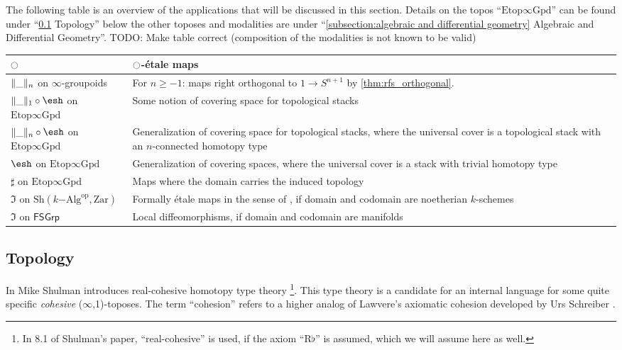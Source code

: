 \documentclass[9pt,twosided]{amsart}
\newcommand{\shape}{\ensuremath{\mathord{\raisebox{0.5pt}{\text{\rm\esh}}}}}
\newcommand{\Zar}{\ensuremath{\mathrm{Zar}}}
\newcommand{\FSGrp}{\ensuremath{\mathsf{FSGrp}}}
\newcommand{\Spaces}{\ensuremath{\mathrm{Etop}\infty\mathrm{Gpd}}}
\newcommand{\todo}[1]{{\color{red}TODO: #1 \\}}
\begin{document}
The following table is an overview of the applications that will be discussed in this section.
Details on the topos ``$\Spaces$'' can be found under ``\ref{subsection:toplogical stacks} Topology'' below the other toposes and modalities are under ``\ref{subsection:algebraic and differential geometry} Algebraic and Differential Geometry''.
\todo{Make table correct (composition of the modalities is not known to be valid)}
\begin{center}
  \begin{tabular}{p{3.5cm}p{8.5cm}}
    \toprule
    ${\ocircle}$ & ${\ocircle}$-étale maps  \\
    \midrule
    $\trunc{n}{\_}$ on $\infty$-groupoids & For $n\geq -1$: maps right orthogonal to $1\to S^{n+1}$ by \cref{thm:rfs_orthogonal}. \\
    $\trunc{1}{\_}\circ\shape$ on $\Spaces$ & Some notion of covering space for topological stacks \\
    $\trunc{n}{\_}\circ\shape$ on $\Spaces$ & Generalization of covering space for topological stacks, where the universal cover is a topological stack with an $n$-connected homotopy type \\
    $\shape$ on $\Spaces$ & Generalization of covering spaces, where the universal cover is a stack with trivial homotopy type \\
    $\sharp$ on $\Spaces$ & Maps where the domain carries the induced topology \\
    $\Im$ on $\mathrm{Sh}(k\mathrm{-Alg}^\mathrm{op} ,\Zar)$ & Formally étale maps in the sense of \cite{GrothendieckDieudonne}, if domain and codomain are noetherian $k$-schemes   \\
    $\Im$ on $\FSGrp$ & Local diffeomorphisms, if domain and codomain are manifolds \\
    \bottomrule
  \end{tabular}
\end{center}

\bigskip

\subsection{Topology}
\label{subsection:toplogical stacks}

In \cite[Section 8]{ShulmanRealCohesion} Mike Shulman introduces real-cohesive homotopy type theory
\footnote{In 8.1 of Shulman's paper, ``real-cohesive'' is used, if the axiom ``$\mathrm{R}\flat$'' is assumed, which we will assume here as well.}.
This type theory is a candidate for an internal language for some quite specific \emph{cohesive} ($\infty$,1)-toposes.
The term ``cohesion'' refers to a higher analog 
of Lawvere's axiomatic cohesion \cite{Lawvere07} developed by Urs Schreiber \cite{SchreiberDcct}.
\end{document}
